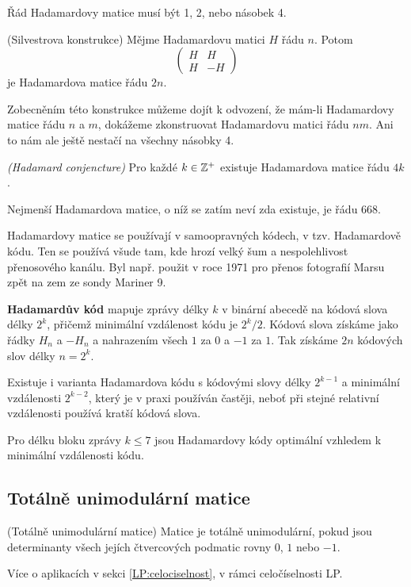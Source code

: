 \tv Řád Hadamardovy matice musí být 1, 2, nebo násobek 4.

\alg (Silvestrova konstrukce) Mějme Hadamardovu matici $H$ řádu $n$. Potom
$$\begin{pmatrix}
H & H \\
H & -H
\end{pmatrix}$$
je Hadamardova matice řádu $2n$.

Zobecněním této konstrukce můžeme dojít k odvození, že mám-li Hadamardovy matice
řádu $n$ a $m$, dokážeme zkonstruovat Hadamardovu matici řádu $nm$. Ani to nám
ale ještě nestačí na všechny násobky 4.

\conj \emph{(Hadamard conjencture)} Pro každé $k \in \mathbb{Z}^+$ existuje Hadamardova
matice řádu $4k$.

\smallskip
Nejmenší Hadamardova matice, o níž se zatím neví zda existuje, je řádu 668.

\smallskip
Hadamardovy matice se používají v samoopravných kódech, v tzv. Hadamardově kódu.
Ten se používá všude tam, kde hrozí velký šum a nespolehlivost přenosového
kanálu. Byl např. použit v roce 1971 pro přenos fotografií Marsu zpět na zem ze
sondy Mariner 9.

\smallskip\noindent\textbf{Hadamardův kód} mapuje zprávy délky $k$ v binární
abecedě na kódová slova délky $2^k$, přičemž minimální vzdálenost kódu je
$2^k/2$. Kódová slova získáme jako řádky $H_n$ a $-H_n$ a nahrazením všech
$1$ za $0$ a $-1$ za $1$. Tak získáme $2n$ kódových slov délky $n = 2^k$.

Existuje i varianta Hadamardova kódu s kódovými slovy délky $2^{k-1}$ a
minimální vzdálenosti $2^{k-2}$, který je v praxi používán častěji, neboť při
stejné relativní vzdálenosti používá kratší kódová slova.

\tv Pro délku bloku zprávy $k \le 7$ jsou Hadamardovy kódy optimální vzhledem k
minimální vzdálenosti kódu.

\subsection{Totálně unimodulární matice}

\df (Totálně unimodulární matice) Matice je totálně unimodulární, pokud jsou
determinanty všech jejích čtvercových podmatic rovny $0$, $1$ nebo $-1$.

Více o aplikacích v sekci \ref{LP:celociselnost}, v rámci celočíselnosti LP.

